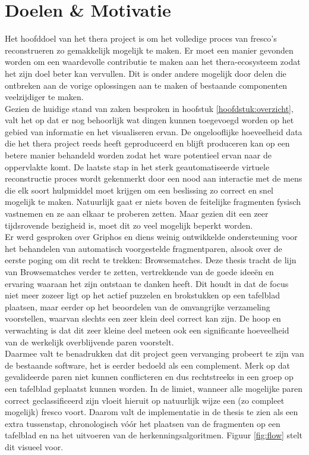 \chapter{Doelen \& Motivatie}
\label{hoofdstuk:doelen}

Het hoofddoel van het thera project is om het volledige proces van fresco's reconstrueren zo gemakkelijk mogelijk te maken. Er moet een manier gevonden worden om een waardevolle contributie te maken aan het thera-ecosysteem zodat het zijn doel beter kan vervullen. Dit is onder andere mogelijk door delen die ontbreken aan de vorige oplossingen aan te maken of bestaande componenten veelzijdiger te maken.\\

Gezien de huidige stand van zaken besproken in hoofstuk \ref{hoofdstuk:overzicht}, valt het op dat er nog behoorlijk wat dingen kunnen toegevoegd worden op het gebied van informatie en het visualiseren ervan. De ongelooflijke hoeveelheid data die het thera project reeds heeft geproduceerd en blijft produceren kan op een betere manier behandeld worden zodat het ware potentieel ervan naar de oppervlakte komt. De laatste stap in het sterk geautomatiseerde virtuele reconstructie proces wordt gekenmerkt door een nood aan interactie met de mens die elk soort hulpmiddel moet krijgen om een beslissing zo correct en snel mogelijk te maken. Natuurlijk gaat er niets boven de feitelijke fragmenten fysisch vastnemen en ze aan elkaar te proberen zetten. Maar gezien dit een zeer tijdsrovende bezigheid is, moet dit zo veel mogelijk beperkt worden.\\

Er werd gesproken over Griphos en diens weinig ontwikkelde ondersteuning voor het behandelen van automatisch voorgestelde fragmentparen, alsook over de eerste poging om dit recht te trekken: Browsematches. Deze thesis tracht de lijn van Browsematches verder te zetten, vertrekkende van de goede idee\"en en ervaring waaraan het zijn ontstaan te danken heeft. Dit houdt in dat de focus niet meer zozeer ligt op het actief puzzelen en brokstukken op een tafelblad plaatsen, maar eerder op het beoordelen van de omvangrijke verzameling voorstellen, waarvan slechts een zeer klein deel correct kan zijn. De hoop en verwachting is dat dit zeer kleine deel meteen ook een significante hoeveelheid van de werkelijk overblijvende paren voorstelt.\\

Daarmee valt te benadrukken dat dit project geen vervanging probeert te zijn van de bestaande software, het is eerder bedoeld als een complement. Merk op dat gevalideerde paren niet kunnen conflicteren en dus rechtstreeks in een groep op een tafelblad geplaatst kunnen worden. In de limiet, wanneer alle mogelijke paren correct geclassificeerd zijn vloeit hieruit op natuurlijk wijze een (zo compleet mogelijk) fresco voort. Daarom valt de implementatie in de thesis te zien als een extra tussenstap, chronologisch v\'o\'or het plaatsen van de fragmenten op een tafelblad en na het uitvoeren van de herkenningsalgoritmen. Figuur \ref{fig:flow} stelt dit visueel voor.

